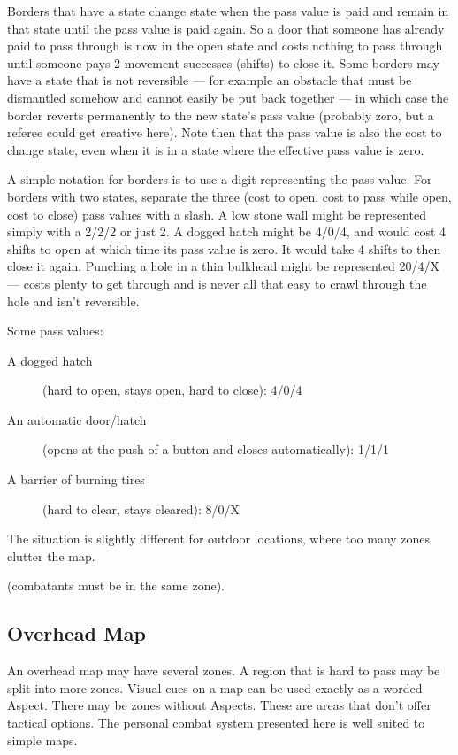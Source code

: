 Borders that have a state change state when the pass value is paid and remain in that state until the pass value is paid again. So a door that someone has already paid to pass through is now in the open state and costs nothing to pass through until someone pays 2 movement successes (shifts) to close it. Some borders may have a state that is not reversible --- for example an obstacle that must be dismantled somehow and cannot easily be put back together --- in which case the border reverts permanently to the new state's pass value (probably zero, but a referee could get creative here). Note then that the pass value is also the cost to change state, even when it is in a state where the effective pass value is zero.

A simple notation for borders is to use a digit representing the pass value. For borders with two states, separate the three (cost to open, cost to pass while open, cost to close) pass values with a slash. A low stone wall might be represented simply with a 2/2/2 or just 2. A dogged hatch might be 4/0/4, and would cost 4 shifts to open at which time its pass value is zero. It would take 4 shifts to then close it again. Punching a hole in a thin bulkhead might be represented 20/4/X --- costs plenty to get through and is never all that easy to crawl through the hole and isn't reversible.

Some pass values:

\begin{description}
\item[A dogged hatch] (hard to open, stays open, hard to close): 4/0/4
\item[An automatic door/hatch] (opens at the push of a button and closes automatically): 1/1/1
\item[A barrier of burning tires] (hard to clear, stays cleared): 8/0/X
\end{description}

The situation is slightly different for outdoor locations, where too many zones clutter the map.

 (combatants must be in the same zone).

\subsection{Overhead Map}
\label{sec:personal-combat-overhead-map}

An overhead map may have several zones. A region that is hard to pass may be split into more zones. Visual cues on a map can be used exactly as a worded Aspect. There may be zones without Aspects. These are areas that don't offer tactical options. The personal combat system presented here is well suited to simple maps.

